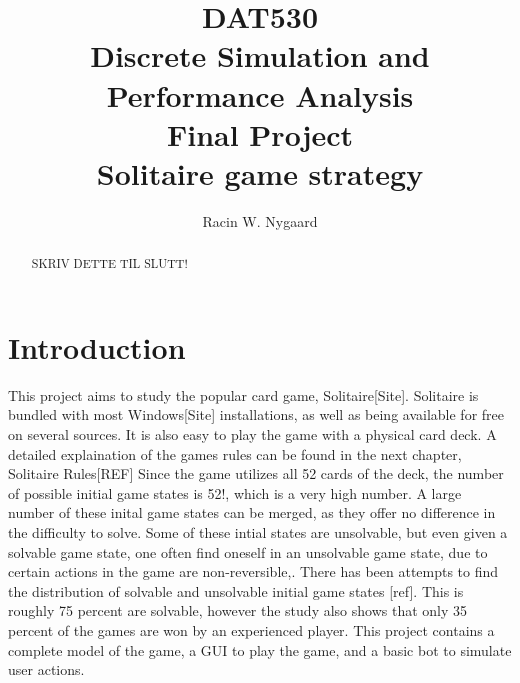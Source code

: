 \documentclass[runningheads,a4paper]{llncs}
\begin{document}
\mainmatter  %

\title{DAT530\\Discrete Simulation and Performance Analysis\\Final Project\\Solitaire game strategy}



\author{Racin W. Nygaard}%

%


%
%

\maketitle


\begin{abstract}
SKRIV DETTE TIL SLUTT!

\end{abstract}


\section{Introduction}
This project aims to study the popular card game, Solitaire[Site]. Solitaire is bundled with most Windows[Site] installations, as well as being available for free on several sources. It is also easy to play the game with a physical card deck. A detailed explaination of the games rules can be found in the next chapter, Solitaire Rules[REF]
\newline
Since the game utilizes all 52 cards of the deck, the number of possible initial game states is 52!, which is a very high number. A large number of these inital game states can be merged, as they offer no difference in the difficulty to solve. Some of these intial states are unsolvable, but even given a solvable game state, one often find oneself in an unsolvable game state, due to certain actions in the game are non-reversible,. There has been attempts to find the distribution of solvable and unsolvable initial game states [ref]. This is roughly 75 percent are solvable, however the study also shows that only 35 percent of the games are won by an experienced player.
\newline
This project contains a complete model of the game, a GUI to play the game, and a basic bot to simulate user actions. 
\end{document}
